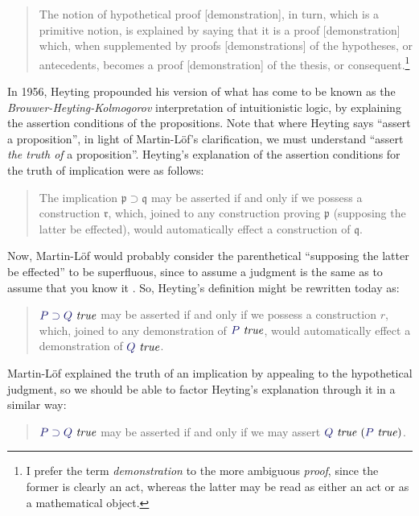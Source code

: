 \documentclass[11pt]{amsart}
\theoremstyle{definition}
\theoremstyle{remark}
\numberwithin{equation}{section}
\def\InputModeColorName{MidnightBlue}
\newcommand\InputMode[1]{{\color{\InputModeColorName}{#1}}}
\newcommand\HypJ[2]{#1\ (#2)}
\newcommand\IsTrue[1]{\InputMode{#1}\ \mathit{true}}
\newcommand\Imp[2]{#1\supset #2}
\begin{document}
\begin{quote}
  The notion of hypothetical proof [demonstration], in turn, which is a
primitive notion, is explained by saying that it is a proof [demonstration]
which, when supplemented by proofs [demonstrations] of the hypotheses, or
antecedents, becomes a proof [demonstration] of the thesis, or
consequent.\footnote{
I prefer the term \emph{demonstration} to the more ambiguous \emph{proof}, since
the former is clearly an act, whereas the latter may be read as either an act or
as a mathematical object.
}
\cite{siena.lectures}
\end{quote}


In 1956, Heyting propounded his version of what has come to be known as the
\emph{Brouwer-Heyting-Kolmogorov} interpretation of intuitionistic logic, by
explaining the assertion conditions of the propositions. Note that where Heyting
says ``assert a proposition'', in light of Martin-L\"of's clarification, we must
understand ``assert \emph{the truth of} a proposition''. Heyting's explanation
of the assertion conditions for the truth of implication were as follows:
\begin{quote}
  The implication $\Imp{\mathfrak{p}}{\mathfrak{q}}$ may be asserted if and only
if we possess a construction $\mathfrak{r}$, which, joined to any construction
proving $\mathfrak{p}$ (supposing the latter be effected), would automatically
effect a construction of $\mathfrak{q}$. \cite{HeytingA:int}
\end{quote}

Now, Martin-L\"of would probably consider the parenthetical ``supposing the
latter be effected'' to be superfluous, since to assume a judgment is the same
as to assume that you know it \cite{siena.lectures}.
So, Heyting's definition might be rewritten today as:

\begin{quote}
$\IsTrue{\Imp{P}{Q}}$ may be asserted if and only if we
possess a construction $r$, which, joined to any demonstration of $\IsTrue{P}$,
would automatically effect a demonstration of $\IsTrue{Q}$.
\end{quote}

Martin-L\"of explained the truth of an implication by appealing to the
hypothetical judgment, so we should be able to factor Heyting's explanation
through it in a similar way:

\begin{quote}
  $\IsTrue{\Imp{P}{Q}}$ may be asserted if and only if we may assert $\HypJ{\IsTrue{Q}}{\IsTrue{P}}$.
\end{quote}
\end{document}
